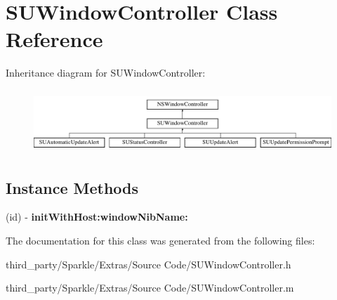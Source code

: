 \hypertarget{interface_s_u_window_controller}{}\section{S\+U\+Window\+Controller Class Reference}
\label{interface_s_u_window_controller}
Inheritance diagram for S\+U\+Window\+Controller\+:\begin{figure}[H]
\begin{center}
\leavevmode
\includegraphics[height=2.400000cm]{interface_s_u_window_controller}
\end{center}
\end{figure}
\subsection*{Instance Methods}
\begin{DoxyCompactItemize}
\item 
\mbox{\label{interface_s_u_window_controller_a5c6e363f447921b9d3b472392f83d14e}} 
(id) -\/ {\bfseries init\+With\+Host\+:window\+Nib\+Name\+:}
\end{DoxyCompactItemize}


The documentation for this class was generated from the following files\+:\begin{DoxyCompactItemize}
\item 
third\+\_\+party/\+Sparkle/\+Extras/\+Source Code/S\+U\+Window\+Controller.\+h\item 
third\+\_\+party/\+Sparkle/\+Extras/\+Source Code/S\+U\+Window\+Controller.\+m\end{DoxyCompactItemize}
